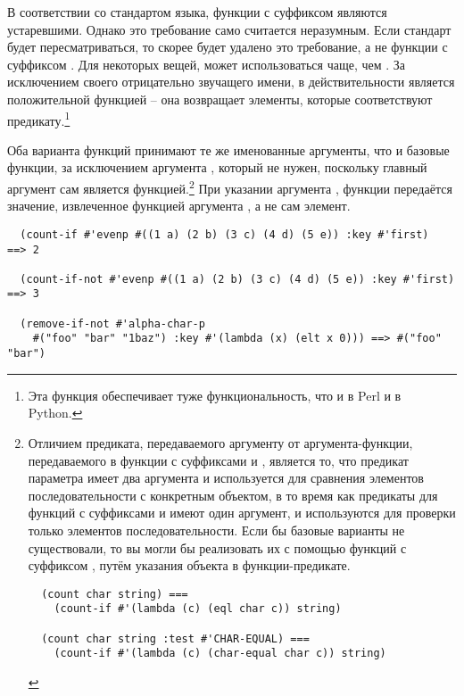 В соответствии со стандартом языка, функции с суффиксом  являются
устаревшими.  Однако это требование само считается неразумным.  Если стандарт будет
пересматриваться, то скорее будет удалено это требование, а не функции с суффиксом
.  Для некоторых вещей,  может использоваться чаще, чем
.  За исключением своего отрицательно звучащего имени, в действительности
 является положительной функцией -- она возвращает элементы, которые
соответствуют предикату.\footnote{Эта функция обеспечивает туже функциональность, что и
   в Perl и  в Python.}

Оба варианта функций принимают те же именованные аргументы, что и базовые функции, за
исключением аргумента , который не нужен, поскольку главный аргумент сам
является функцией.\footnote{Отличием предиката, передаваемого аргументу  от
  аргумента-функции, передаваемого в функции с суффиксами  и ,
  является то, что предикат параметра  имеет два аргумента и используется для
  сравнения элементов последовательности с конкретным объектом, в то время как предикаты
  для функций с суффиксами  и  имеют один аргумент, и используются
  для проверки только элементов последовательности.  Если бы базовые варианты не
  существовали, то вы могли бы реализовать их с помощью функций с суффиксом ,
  путём указания объекта в функции-предикате.

\begin{verbatim}
  (count char string) ===
    (count-if #'(lambda (c) (eql char c)) string)
  
  (count char string :test #'CHAR-EQUAL) ===
    (count-if #'(lambda (c) (char-equal char c)) string)
\end{verbatim}

}  При указании аргумента , функции передаётся значение, извлеченное функцией
аргумента , а не сам элемент.

\begin{verbatim}
  (count-if #'evenp #((1 a) (2 b) (3 c) (4 d) (5 e)) :key #'first)     ==> 2

  (count-if-not #'evenp #((1 a) (2 b) (3 c) (4 d) (5 e)) :key #'first) ==> 3

  (remove-if-not #'alpha-char-p
    #("foo" "bar" "1baz") :key #'(lambda (x) (elt x 0))) ==> #("foo" "bar")
\end{verbatim}

